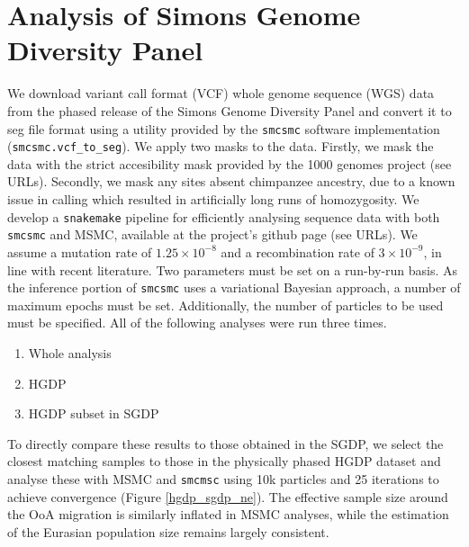 \documentclass{article}
\begin{document}
\newpage
\setcounter{section}{0}
\renewcommand{\thesection}{S\arabic{section}}%
\setcounter{table}{0}
\renewcommand{\thetable}{S\arabic{table}}%
\setcounter{figure}{0}
\renewcommand{\thefigure}{S\arabic{figure}}%

\section{Analysis of Simons Genome Diversity Panel}

We download variant call format (VCF) whole genome sequence (WGS) data from the phased release of the Simons Genome Diversity Panel and convert it to seg file format using a utility provided by the {\tt smcsmc} software implementation ({\tt smcsmc.vcf\_to\_seg}). We apply two masks to the data. Firstly, we mask the data with the strict accesibility mask provided by the 1000 genomes project (see URLs). Secondly, we mask any sites absent chimpanzee ancestry, due to a known issue in calling which resulted in artificially long runs of homozygosity. We develop a {\tt snakemake} pipeline for efficiently analysing sequence data with both {\tt smcsmc} and MSMC, available at the project's github page (see URLs). We assume a mutation rate of $1.25\times10^{-8}$ and a recombination rate of $3\times10^{-9}$, in line with recent literature. Two parameters must be set on a run-by-run basis. As the inference portion of {\tt smcsmc} uses a variational Bayesian approach, a number of maximum epochs must be set. Additionally, the number of particles to be used must be specified. All of the following analyses were run three times. 



\begin{enumerate}
    \item Whole analysis
    \item HGDP 
    \item HGDP subset in SGDP
\end{enumerate}

To directly compare these results to those obtained in the SGDP, we select the closest matching samples to those in the physically phased HGDP dataset and analyse these with MSMC and {\tt smcmsc} using 10k particles and 25 iterations to achieve convergence (Figure \ref{hgdp_sgdp_ne}). The effective sample size around the OoA migration is similarly inflated in MSMC analyses, while the estimation of the Eurasian population size remains largely consistent.  
\end{document}

